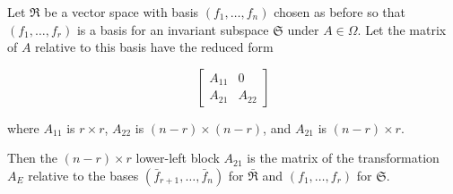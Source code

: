Let $\Re$ be a vector space with basis $(f_1, \ldots, f_n)$ chosen as before so that $(f_1, \ldots, f_r)$ is a basis for an invariant subspace $\mathfrak{S}$ under $A \in \Omega$. Let the matrix of $A$ relative to this basis have the reduced form

$$\begin{bmatrix}
A_{11} & 0 \\
A_{21} & A_{22}
\end{bmatrix}$$

where $A_{11}$ is $r \times r$, $A_{22}$ is $(n-r) \times (n-r)$, and $A_{21}$ is $(n-r) \times r$.

Then the $(n-r) \times r$ lower-left block $A_{21}$ is the matrix of the transformation $A_E$ relative to the bases $(\bar{f}_{r+1}, \ldots, \bar{f}_n)$ for $\bar{\Re}$ and $(f_1, \ldots, f_r)$ for $\mathfrak{S}$.
